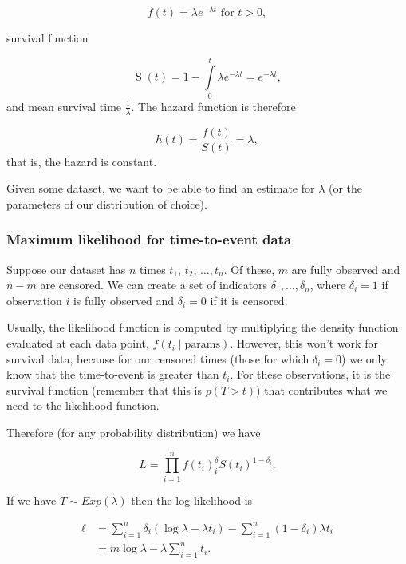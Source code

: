 \documentclass[
  openany]{book}
\theoremstyle{definition}
\theoremstyle{definition}
\theoremstyle{definition}
\theoremstyle{definition}
\theoremstyle{remark}
\begin{document}
\[f\left(t\right) = \lambda e^{-\lambda t} \text{ for }t>0,\]

survival function

\[\operatorname{S}\left(t\right) = 1- \int\limits_{0}^t{\lambda e^{-\lambda t}} = e^{-\lambda t}, \]
and mean survival time \(\frac{1}{\lambda}\). The hazard function is therefore

\[h\left(t\right) = \frac{f\left(t\right)}{S\left(t\right)} = \lambda, \]
that is, the hazard is constant.

Given some dataset, we want to be able to find an estimate for \(\lambda\) (or the parameters of our distribution of choice).

\hypertarget{expll}{%
\subsubsection{Maximum likelihood for time-to-event data}\label{expll}}

Suppose our dataset has \(n\) times \(t_1,\,t_2,\,\ldots,t_n\). Of these, \(m\) are fully observed and \(n-m\) are censored. We can create a set of indicators \(\delta_1,\ldots,\delta_n\), where \(\delta_i=1\) if observation \(i\) is fully observed and \(\delta_i=0\) if it is censored.

Usually, the likelihood function is computed by multiplying the density function evaluated at each data point, \(f\left(t_i\mid{\text{params}}\right)\). However, this won't work for survival data, because for our censored times (those for which \(\delta_i=0\)) we only know that the time-to-event is greater than \(t_i\). For these observations, it is the survival function (remember that this is \(p\left(T>t\right)\)) that contributes what we need to the likelihood function.

Therefore (for any probability distribution) we have

\begin{equation}
L = \prod\limits_{i=1}^n f\left(t_i\right)^\delta_i S\left(t_i\right)^{1-\delta_i}.
\label{eq:lfunsurv}
\end{equation}

If we have \(T\sim Exp\left(\lambda\right)\) then the log-likelihood is

\[
\begin{aligned}
\ell &= \sum\limits_{i=1}^n \delta_i\left(\log\lambda - \lambda t_i\right) - \sum\limits_{i=1}^n\left(1-\delta_i\right)\lambda t_i \\
& =  m\log\lambda - \lambda\sum\limits_{i=1}^n t_i. 
\end{aligned}
\]
\end{document}
